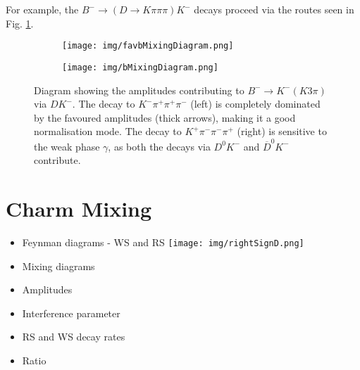 \documentclass[note.tex]{subfiles}
\begin{document}
For example, the $B^- \rightarrow (D \rightarrow K \pi \pi \pi) K^-$ decays proceed via the routes seen in Fig. \ref{b mixing}.

\begin{figure}[htb!]
    \begin{subfigure}[htb!]{0.5\linewidth}
        \texttt{[image: img/favbMixingDiagram.png]}
    \end{subfigure}
    \begin{subfigure}[htb!]{0.5\linewidth}
        \texttt{[image: img/bMixingDiagram.png]}
    \end{subfigure}
    \caption{Diagram showing the amplitudes contributing to $B^-\rightarrow K^-(K3\pi)$ via $DK^-$.
        The decay to $K^-\pi^+\pi^+\pi^-$ (left) is completely dominated by the favoured amplitudes (thick arrows), making it a good normalisation mode.
        The decay to $K^+\pi^-\pi^-\pi^+$ (right) is sensitive to the weak phase $\gamma$, as both the decays via $D^0K^-$ and $\overline{D}^
0K^-$ contribute.
    }
    \label{b mixing}
\end{figure}



\section{Charm Mixing}
\begin{itemize}
    \item Feynman diagrams - WS and RS
    \texttt{[image: img/rightSignD.png]}
    \item Mixing diagrams
    \item Amplitudes
    \item Interference parameter
    \item RS and WS decay rates
    \item Ratio
\end{itemize}
\end{document}

